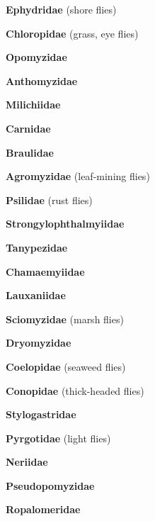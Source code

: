\documentclass[letterpaper,10pt]{article}
\begin{document}
{\makebox[0.6cm]{}  \textbf{Ephydridae} (shore flies) \par
\makebox[0.6cm]{}  \textbf{Chloropidae} (grass, eye flies) \par
\makebox[0.6cm]{}  \textbf{Opomyzidae}  \par
\makebox[0.6cm]{}  \textbf{Anthomyzidae} \par
\makebox[0.6cm]{}  \textbf{Milichiidae} \par
\makebox[0.6cm]{}  \textbf{Carnidae} \par
\makebox[0.6cm]{}  \textbf{Braulidae} \par
\makebox[0.6cm]{}  \textbf{Agromyzidae} (leaf-mining flies) \par
\makebox[0.6cm]{}  \textbf{Psilidae} (rust flies) \par
\makebox[0.6cm]{}  \textbf{Strongylophthalmyiidae} \par
\makebox[0.6cm]{}  \textbf{Tanypezidae} \par
\makebox[0.6cm]{}  \textbf{Chamaemyiidae} \par
\makebox[0.6cm]{}  \textbf{Lauxaniidae} \par
\makebox[0.6cm]{}  \textbf{Sciomyzidae} (marsh flies) \par
\makebox[0.6cm]{}  \textbf{Dryomyzidae} \par
\makebox[0.6cm]{}  \textbf{Coelopidae} (seaweed flies) \par
\makebox[0.6cm]{}  \textbf{Conopidae} (thick-headed flies) \par
\makebox[0.6cm]{}  \textbf{Stylogastridae} \par
\makebox[0.6cm]{}  \textbf{Pyrgotidae} (light flies) \par
\makebox[0.6cm]{}  \textbf{Neriidae} \par
\makebox[0.6cm]{}  \textbf{Pseudopomyzidae} \par
\makebox[0.6cm]{}  \textbf{Ropalomeridae} \par
}
\end{document}
